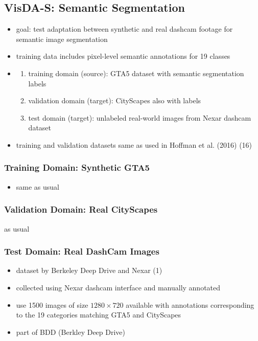 \documentclass[]{article}
\begin{document}
\subsection{VisDA-S: Semantic Segmentation}
\begin{itemize}
	\item goal: test adaptation between synthetic and real dashcam footage for semantic image segmentation
	\item training data includes pixel-level semantic annotations for 19 classes
	\item \begin{enumerate}
		\item training domain (source): GTA5 dataset with semantic segmentation labels
		\item validation domain (target): CityScapes also with labels
		\item test domain (target): unlabeled real-world images from Nexar dashcam dataset
	\end{enumerate}
	\item training and validation datasets same as used in Hoffman et al. (2016) (16)
\end{itemize}
\subsubsection{Training Domain: Synthetic GTA5}
\begin{itemize}
	\item same as usual
\end{itemize}

\subsubsection{Validation Domain: Real CityScapes}
as usual

\subsubsection{Test Domain: Real DashCam Images}
\begin{itemize}
	\item dataset by Berkeley Deep Drive and Nexar (1)
	\item collected using Nexar dashcam interface and manually annotated
	\item use 1500 images of size $1280 \times 720$ available with annotations corresponding to the 19 categories matching GTA5 and CityScapes
	\item part of BDD (Berkley Deep Drive)
\end{itemize}
\end{document}
